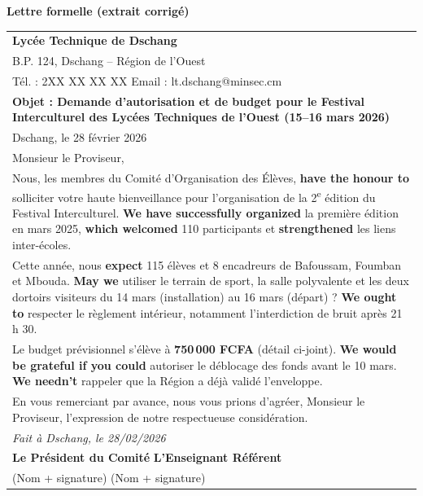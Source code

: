 \documentclass[11pt]{article}
\begin{document}
\begin{corrige}
\textbf{Lettre formelle (extrait corrigé)}

\begin{center}
\begin{tabularx}{\linewidth}{|X|}\hline
\textbf{Lycée Technique de Dschang} \\
B.P. 124, Dschang -- Région de l'Ouest \\
Tél. : 2XX XX XX XX \quad Email : lt.dschang@minsec.cm \\ \hline
\textbf{Objet : Demande d'autorisation et de budget pour le Festival Interculturel des Lycées Techniques de l'Ouest (15--16 mars 2026)} \\ \hline
Dschang, le 28 février 2026 \\ \hline
Monsieur le Proviseur, \\ \hline
Nous, les membres du Comité d'Organisation des Élèves, \textbf{have the honour to} solliciter votre haute bienveillance pour l'organisation de la 2\textsuperscript{e} édition du Festival Interculturel. \textbf{We have successfully organized} la première édition en mars 2025, \textbf{which welcomed} 110 participants et \textbf{strengthened} les liens inter-écoles. \\ \hline
Cette année, nous \textbf{expect} 115 élèves et 8 encadreurs de Bafoussam, Foumban et Mbouda. \textbf{May we} utiliser le terrain de sport, la salle polyvalente et les deux dortoirs visiteurs du 14 mars (installation) au 16 mars (départ) ? \textbf{We ought to} respecter le règlement intérieur, notamment l'interdiction de bruit après 21 h 30. \\ \hline
Le budget prévisionnel s'élève à \textbf{750\,000 FCFA} (détail ci-joint). \textbf{We would be grateful if you could} autoriser le déblocage des fonds avant le 10 mars. \textbf{We needn't} rappeler que la Région a déjà validé l'enveloppe. \\ \hline
En vous remerciant par avance, nous vous prions d'agréer, Monsieur le Proviseur, l'expression de notre respectueuse considération. \\ \hline
\textit{Fait à Dschang, le 28/02/2026} \\
\textbf{Le Président du Comité} \quad \textbf{L'Enseignant Référent} \\
(Nom + signature) \quad (Nom + signature) \\ \hline
\end{tabularx}
\end{center}


\end{corrige}
\end{document}
